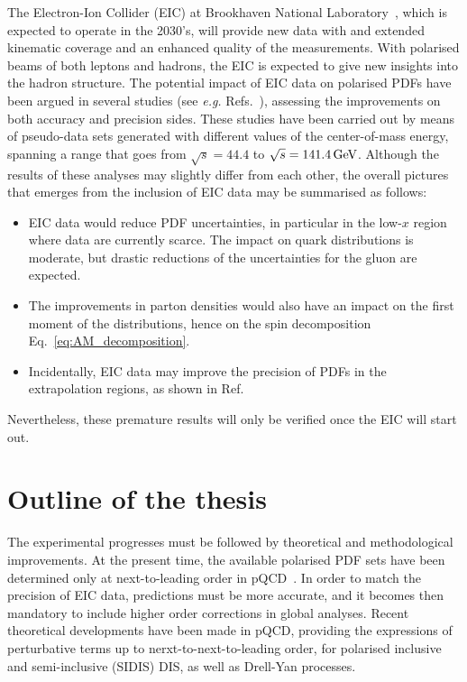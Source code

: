 The Electron-Ion Collider (EIC) at Brookhaven National Laboratory~\cite{AbdulKhalek:2021gbh}, which is expected to operate in the 2030's, 
will provide new data with and extended kinematic coverage and an enhanced quality of the measurements. With polarised beams of both leptons and hadrons, the EIC is expected to give new insights into the hadron structure. The potential impact of EIC data on polarised PDFs have been argued in several studies (see \textit{e.g.} Refs.~\cite{Borsa:2020lsz, Aschenauer:2012ve, Ball:2013tyh, Aschenauer:2015ata}), assessing the improvements on both accuracy and precision sides. These studies have been carried out by means of pseudo-data sets generated with different values of the center-of-mass energy, spanning a range that goes from $\sqrt{s} = 44.4$ to $\sqrt{s} = 141.4 \,\textrm{GeV}$. Although the results of these analyses may slightly differ from each other, the overall pictures that emerges from the inclusion of EIC data may be summarised as follows:
%
\begin{itemize}
  \item EIC data would reduce PDF uncertainties, in particular in the low-$x$ region where data are currently scarce. The impact on quark distributions is moderate, but drastic reductions of the uncertainties for the gluon are expected.
  \item The improvements in parton densities would also have an impact on the first moment of the distributions, hence on the spin decomposition Eq.~\eqref{eq:AM_decomposition}.
  \item Incidentally, EIC data may improve the precision of PDFs in the extrapolation regions, as shown in Ref.~\cite{Ball:2013tyh}
\end{itemize}
%
Nevertheless, these premature results will only be verified once the EIC will start out.

\section{Outline of the thesis}

The experimental progresses must be followed by theoretical and methodological improvements. At the present time, the available polarised PDF sets have been determined only at next-to-leading order in pQCD~\cite{deFlorian:2008mr, Ethier:2017zbq, Nocera:2014gqa}. In order to match the precision of EIC data, predictions must be more accurate, and it becomes then mandatory to include higher order corrections in global analyses. Recent theoretical developments have been made in pQCD, providing the expressions of perturbative terms up to nerxt-to-next-to-leading order, for polarised inclusive and semi-inclusive (SIDIS) DIS, as well as Drell-Yan processes.%

